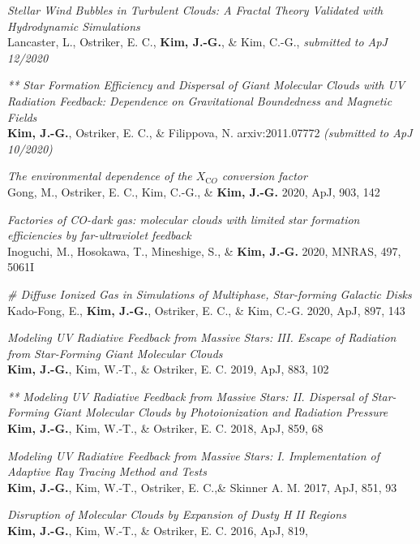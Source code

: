 \begin{benumerate}{13}
\item \textit{Stellar Wind Bubbles in Turbulent Clouds:
A Fractal Theory Validated with Hydrodynamic Simulations}\\
  Lancaster, L., Ostriker, E. C., \textbf{Kim, J.-G.}, \& Kim, C.-G.,
  \textit{submitted to ApJ 12/2020}
\item \textit{** Star Formation Efficiency and Dispersal of Giant Molecular
    Clouds with UV Radiation Feedback: Dependence on Gravitational Boundedness
    and Magnetic Fields} \\ \textbf{Kim, J.-G.}, Ostriker, E. C., \& Filippova, N. arxiv:2011.07772 \textit{(submitted to
    ApJ 10/2020)}
\item \textit{The environmental dependence of the $X_{\mathrm CO}$ conversion
    factor}\\ Gong, M., Ostriker, E. C., Kim, C.-G., \& \textbf{Kim,
    J.-G.} 2020, ApJ, 903, 142 
\item \textit{Factories of CO-dark gas: molecular clouds with limited star
formation efficiencies by far-ultraviolet feedback} \\
  Inoguchi, M., Hosokawa, T., Mineshige, S., \& \textbf{Kim, J.-G.} 2020, MNRAS,
  497, 5061I
\item \textit{\# Diffuse Ionized Gas in Simulations of Multiphase, Star-forming
    Galactic Disks}\\
  Kado-Fong, E., \textbf{Kim, J.-G.}, Ostriker, E. C., \& Kim, C.-G. 2020, ApJ,
  897, 143
\item \textit{Modeling UV Radiative Feedback from Massive Stars: III. Escape
    of Radiation from Star-Forming Giant Molecular Clouds} \\ \textbf{Kim,
    J.-G.}, Kim, W.-T., \& Ostriker, E. C. 2019, ApJ, 883, 102
\item \textit{** Modeling UV Radiative Feedback from Massive Stars: II. Dispersal
of Star-Forming Giant Molecular Clouds by Photoionization and Radiation
Pressure} \\ \textbf{Kim, J.-G.}, Kim, W.-T., \& Ostriker, E. C. 2018, ApJ, 859,
68
\item \textit{Modeling UV Radiative Feedback from Massive Stars: I.
Implementation of Adaptive Ray Tracing Method and Tests}\\ \textbf{Kim, J.-G.},
Kim, W.-T., Ostriker, E. C.,\& Skinner A. M. 2017, ApJ, 851, 93
\item \textit{Disruption of Molecular Clouds by Expansion of Dusty H II
Regions}\\ \textbf{Kim, J.-G.}, Kim, W.-T., \& Ostriker, E. C. 2016, ApJ, 819,

\end{benumerate}

